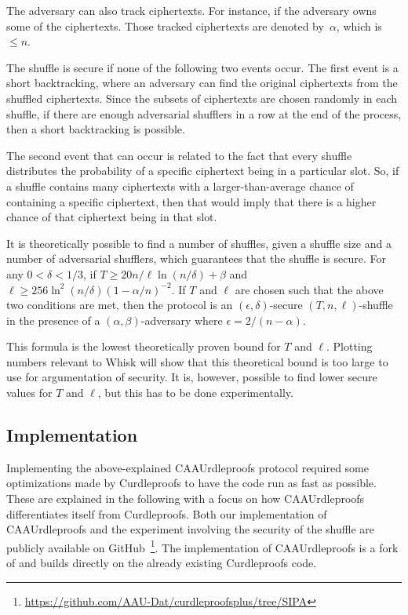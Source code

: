 The adversary can also track ciphertexts.
For instance, if the adversary owns some of the ciphertexts.
Those tracked ciphertexts are denoted by~$\alpha$, which is $\leq n$.

The shuffle is secure if none of the following two events occur.
The first event is a short backtracking, where an adversary can find the original ciphertexts from the shuffled ciphertexts.
Since the subsets of ciphertexts are chosen randomly in each shuffle, if there are enough adversarial shufflers in a row at the end of the process, then a short backtracking is possible.

The second event that can occur is related to the fact that every shuffle distributes the probability of a specific ciphertext being in a particular slot.
So, if a shuffle contains many ciphertexts with a larger-than-average chance of containing a specific ciphertext, then that would imply that there is a higher chance of that ciphertext being in that slot.

It is theoretically possible to find a number of shuffles, given a shuffle size and a number of adversarial shufflers, which guarantees that the shuffle is secure.
For any $0 < \delta < 1/3$, if $T \geq 20 n / \ell \ln(n/\delta) + \beta $ and $ \ell \geq 256 \ln^2(n/\delta)(1 - \alpha/n)^{-2}$.
If $T$ and $\ell$ are chosen such that the above two conditions are met, then the protocol is an $(\epsilon , \delta)$-secure $(T,n,\ell)$-shuffle in the presence of a $(\alpha, \beta)$-adversary where $\epsilon = 2/(n-\alpha)$.

This formula is the lowest theoretically proven bound for $T$ and $\ell$.
Plotting numbers relevant to Whisk will show that this theoretical bound is too large to use for argumentation of security.
It is, however, possible to find lower secure values for $T$ and $\ell$, but this has to be done experimentally.


\subsection{Implementation}\label{subsec:approach-implementation}
Implementing the above-explained CAAUrdleproofs protocol required some optimizations made by Curdleproofs to have the code run as fast as possible.
These are explained in the following with a focus on how CAAUrdleproofs differentiates itself from Curdleproofs.
Both our implementation of CAAUrdleproofs and the experiment involving the security of the shuffle are publicly available on GitHub~\footnote{\href{https://github.com/AAU-Dat/curdleproofsplus/tree/SIPA}{https://github.com/AAU-Dat/curdleproofsplus/tree/SIPA}}.
The implementation of CAAUrdleproofs is a fork of and builds directly on the already existing Curdleproofs code.
